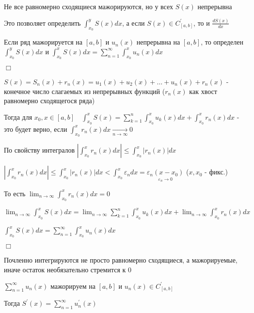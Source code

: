 \documentclass[12pt]{article}
\begin{document}
    \Nota Не все равномерно сходящиеся мажорируются, но у всех $S(x)$ непрерывна

    Это позволяет определить $\int_{x_0}^y S(x) dx$, а если $S(x) \in C^\prime_{[a, b]}$, то и $\frac{dS(x)}{dx}$

    \hypertarget{functionalsumintegral}{}

    \begin{MyTheorem}
        \Ths Если ряд мажорируется на $[a, b]$ и $u_n(x)$ непрерывна на $[a, b]$, то определен $\int_{x_0}^y S(x)dx$ и 
        $\int_{x_0}^x S(x)dx  = \sum_{n = 1}^\infty \int_{x_0}^x u_n(x) dx$
    \end{MyTheorem}

    \begin{MyProof}
        $\Box$

        $S(x) = S_n(x) + r_n(x) = u_1(x) + u_2(x) + \dots + u_n(x) + r_n(x)$ - конечное число слагаемых из непрерывных функций
        ($r_n(x)$ как хвост равномерно сходящегося ряда)

        Тогда для $x_0, x \in [a, b] \quad \int_{x_0}^x S(x) = \sum_{k = 1}^n \int_{x_0}^x u_k(x) dx + \int_{x_0}^x r_n(x) dx$ - это будет
        верно, если $\int_{x_0}^x r_n(x) dx \underset{n \to \infty}{\longrightarrow} 0$

        По свойству интегралов $\left|\int_{x_0}^x r_n(x) dx\right| \leq \int_{x_0}^x |r_n(x)| dx$

        $\left|\int_{x_0}^x r_n(x) dx\right| \leq \int_{x_0}^x |r_n(x)| dx < \int_{x_0}^x \varepsilon_n dx = \underset{\varepsilon_n \to 0}{\varepsilon_n (x - x_0)}$ ($x, x_0$ - фикс.)

        То есть $\lim_{n \to \infty} \int_{x_0}^x r_n(x) dx = 0$

        $\lim_{n \to \infty} \int_{x_0}^x S(x) dx = \lim_{n \to \infty} \sum_{k = 1}^n \int_{x_0}^x u_k(x) dx + \lim_{n \to \infty} \int_{x_0}^x r_n(x) dx$

        $\int_{x_0}^x S(x) dx = \sum_{n = 1}^\infty \int_{x_0}^x u_n(x) dx$

        $\Box$
    \end{MyProof}

    \Nota Почленно интегрируются не просто равномерно сходящиеся, а мажорируемые, иначе остаток необязательно стремится к 0

    \hypertarget{functionalsumderivative}{}

    \begin{MyTheorem}
        \Ths $\sum_{n = 1}^\infty u_n(x)$ мажорируем на $[a, b]$ и $u_n(x) \in C^\prime_{[a, b]}$

        Тогда $S^\prime(x) = \sum_{n = 1}^\infty u^\prime_n(x)$
    \end{MyTheorem}
\end{document}
